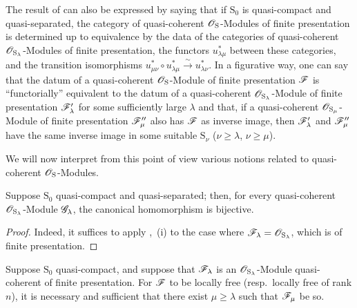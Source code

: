 \begin{env}[8.5.3]
\label{IV.8.5.3}
The result of  can also be expressed by saying that if $\mathrm{S}_0$ is quasi-compact and quasi-separated, the category of quasi-coherent $\mathscr{O}_\mathrm{S}$-Modules of finite presentation is determined up to equivalence by the data of the categories of quasi-coherent $\mathscr{O}_{\mathrm{S}_\lambda}$-Modules of finite presentation, the functors $u_{\lambda\mu}^*$ between these categories, and the transition isomorphisms $u_{\mu\nu}^*\circ u_{\lambda\mu}^*\xrightarrow{\sim}u_{\lambda\nu}^*$.
In a figurative way, one can say that the datum of a quasi-coherent $\mathscr{O}_\mathrm{S}$-Module of finite presentation $\mathscr{F}$ is ``functorially'' equivalent to the datum of a quasi-coherent $\mathscr{O}_{\mathrm{S}_\lambda}$-Module of finite presentation $\mathscr{F}'_\lambda$ for some sufficiently large $\lambda$ and that, if a quasi-coherent $\mathscr{O}_{\mathrm{S}_\mu}$-Module of finite presentation $\mathscr{F}''_\mu$ also has $\mathscr{F}$ as inverse image, then $\mathscr{F}'_\lambda$ and $\mathscr{F}''_\mu$ have the same inverse image in some suitable $\mathrm{S}_\nu$ ($\nu\geqslant\lambda$, $\nu\geqslant\mu$).

We will now interpret from this point of view various notions related to quasi-coherent $\mathscr{O}_\mathrm{S}$-Modules.
\end{env}

\begin{corollary}[8.5.4]
\label{IV.8.5.4}
Suppose $\mathrm{S}_0$ quasi-compact and quasi-separated; then, for every quasi-coherent $\mathscr{O}_{\mathrm{S}_\lambda}$-Module $\mathscr{G}_\lambda$, the canonical homomorphism  is bijective.
\end{corollary}

\begin{proof}
Indeed, it suffices to apply ,~(i) to the case where $\mathscr{F}_\lambda=\mathscr{O}_{\mathrm{S}_\lambda}$, which is of finite presentation.
\end{proof}

\begin{proposition}[8.5.5]
\label{IV.8.5.5}
Suppose $\mathrm{S}_0$ quasi-compact, and suppose that $\mathscr{F}_\lambda$ is an $\mathscr{O}_{\mathrm{S}_\lambda}$-Module quasi-coherent of finite presentation.
For $\mathscr{F}$ to be locally free (resp.\ locally free of rank $n$), it is necessary and sufficient that there exist $\mu\geqslant\lambda$ such that $\mathscr{F}_\mu$ be so.
\end{proposition}

